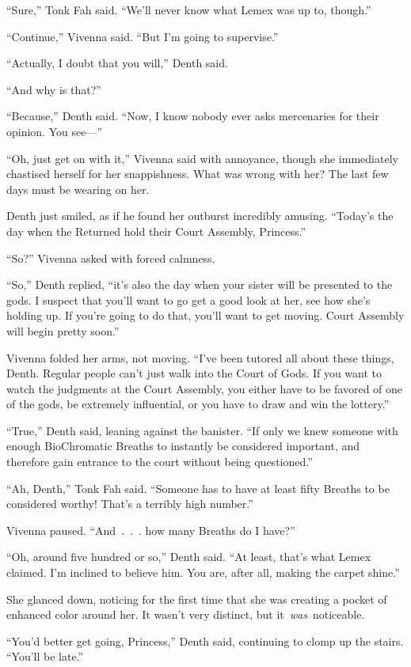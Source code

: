 “Sure,” Tonk Fah said. “We’ll never know what Lemex was up to, though.”

“Continue,” Vivenna said. “But I’m going to supervise.”

“Actually, I doubt that you will,” Denth said.

“And why is that?”

“Because,” Denth said. “Now, I know nobody ever asks mercenaries for their opinion. You see—”

“Oh, just get on with it,” Vivenna said with annoyance, though she immediately chastised herself for her snappishness. What was wrong with her? The last few days must be wearing on her.

Denth just smiled, as if he found her outburst incredibly amusing. “Today’s the day when the Returned hold their Court Assembly, Princess.”

“So?” Vivenna asked with forced calmness.

“So,” Denth replied, “it’s also the day when your sister will be presented to the gods. I suspect that you’ll want to go get a good look at her, see how she’s holding up. If you’re going to do that, you’ll want to get moving. Court Assembly will begin pretty soon.”

Vivenna folded her arms, not moving. “I’ve been tutored all about these things, Denth. Regular people can’t just walk into the Court of Gods. If you want to watch the judgments at the Court Assembly, you either have to be favored of one of the gods, be extremely influential, or you have to draw and win the lottery.”

“True,” Denth said, leaning against the banister. “If only we knew someone with enough BioChromatic Breaths to instantly be considered important, and therefore gain entrance to the court without being questioned.”

“Ah, Denth,” Tonk Fah said. “Someone has to have at least fifty Breaths to be considered worthy! That’s a terribly high number.”

Vivenna paused. “And~.~.~. how many Breaths do I have?”

“Oh, around five hundred or so,” Denth said. “At least, that’s what Lemex claimed. I’m inclined to believe him. You are, after all, making the carpet shine.”

She glanced down, noticing for the first time that she was creating a pocket of enhanced color around her. It wasn’t very distinct, but it~\textit{was}~noticeable.

“You’d better get going, Princess,” Denth said, continuing to clomp up the stairs. “You’ll be late.”

